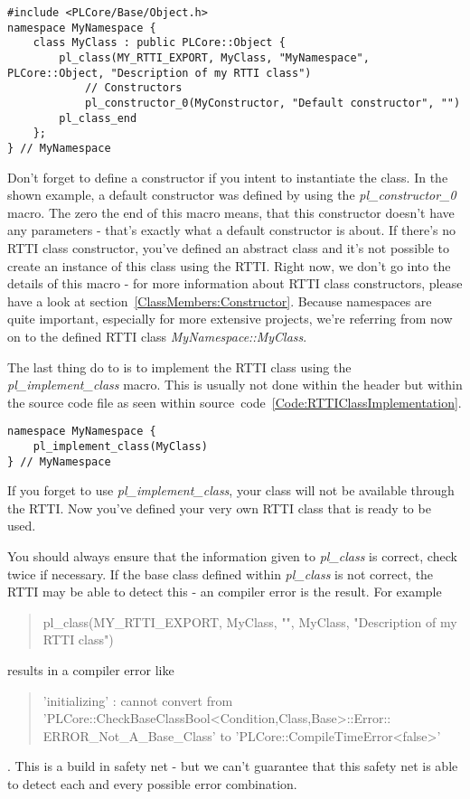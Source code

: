 \begin{lstlisting}[float=htb,label=Code:RTTIClassDefinitionWithNamespace,caption={Defining a new RTTI class with namespace}]
#include <PLCore/Base/Object.h>
namespace MyNamespace {
	class MyClass : public PLCore::Object {
		pl_class(MY_RTTI_EXPORT, MyClass, "MyNamespace", PLCore::Object, "Description of my RTTI class")
			// Constructors
			pl_constructor_0(MyConstructor, "Default constructor", "")
		pl_class_end
	};
} // MyNamespace
\end{lstlisting}
Don't forget to define a constructor if you intent to instantiate the class. In the shown example, a default constructor was defined by using the \emph{pl\_constructor\_0} macro.  The zero the end of this macro means, that this constructor doesn't have any parameters - that's exactly what a default constructor is about. If there's no RTTI class constructor, you've defined an abstract class and it's not possible to create an instance of this class using the RTTI. Right now, we don't go into the details of this macro - for more information about RTTI class constructors, please have a look at section~\ref{ClassMembers:Constructor}. Because namespaces are quite important, especially for more extensive projects, we're referring from now on to the defined RTTI class \emph{MyNamespace::MyClass}.

The last thing do to is to implement the RTTI class using the \emph{pl\_implement\_class} macro. This is usually not done within the header but within the source code file as seen within source~code~\ref{Code:RTTIClassImplementation}.
\begin{lstlisting}[float=htb,label=Code:RTTIClassImplementation,caption={Implementing a new RTTI class}]
namespace MyNamespace {
	pl_implement_class(MyClass)
} // MyNamespace
\end{lstlisting}
If you forget to use \emph{pl\_implement\_class}, your class will not be available through the RTTI. Now you've defined your very own RTTI class that is ready to be used.

You should always ensure that the information given to \emph{pl\_class} is correct, check twice if necessary. If the base class defined within \emph{pl\_class} is not correct, the RTTI may be able to detect this - an compiler error is the result. For example \begin{quote}pl\_class(MY\_RTTI\_EXPORT, MyClass, "", MyClass, "Description of my RTTI class")\end{quote} results in a compiler error like \begin{quote}'initializing' : cannot convert from\\'PLCore::CheckBaseClassBool<Condition,Class,Base>::Error::\\ERROR\_Not\_A\_Base\_Class' to 'PLCore::CompileTimeError<false>'\end{quote}. This is a build in safety net - but we can't guarantee that this safety net is able to detect each and every possible error combination.


